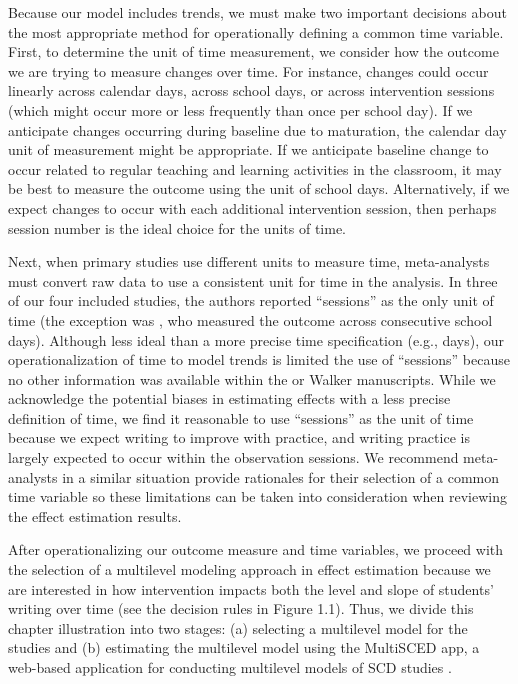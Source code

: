 \documentclass[
]{book}
\begin{document}
Because our model includes trends, we must make two important decisions about the most appropriate method for operationally defining a common time variable. First, to determine the unit of time measurement, we consider how the outcome we are trying to measure changes over time. For instance, changes could occur linearly across calendar days, across school days, or across intervention sessions (which might occur more or less frequently than once per school day). If we anticipate changes occurring during baseline due to maturation, the calendar day unit of measurement might be appropriate. If we anticipate baseline change to occur related to regular teaching and learning activities in the classroom, it may be best to measure the outcome using the unit of school days. Alternatively, if we expect changes to occur with each additional intervention session, then perhaps session number is the ideal choice for the units of time.

Next, when primary studies use different units to measure time, meta-analysts must convert raw data to use a consistent unit for time in the analysis. In three of our four included studies, the authors reported ``sessions'' as the only unit of time (the exception was \citet{stotz2008Effects}, who measured the outcome across consecutive school days). Although less ideal than a more precise time specification (e.g., days), our operationalization of time to model trends is limited the use of ``sessions'' because no other information was available within the \citet{lewandowski2011effects} or Walker \citetext{\citeyear{walker2005using}; \citeyear{walker2007improving}} manuscripts. While we acknowledge the potential biases in estimating effects with a less precise definition of time, we find it reasonable to use ``sessions'' as the unit of time because we expect writing to improve with practice, and writing practice is largely expected to occur within the observation sessions. We recommend meta-analysts in a similar situation provide rationales for their selection of a common time variable so these limitations can be taken into consideration when reviewing the effect estimation results.

After operationalizing our outcome measure and time variables, we proceed with the selection of a multilevel modeling approach in effect estimation because we are interested in how intervention impacts both the level and slope of students' writing over time (see the decision rules in Figure 1.1). Thus, we divide this chapter illustration into two stages: (a) selecting a multilevel model for the studies and (b) estimating the multilevel model using the MultiSCED app, a web-based application for conducting multilevel models of SCD studies \citep{Declercq2020}.
\end{document}
